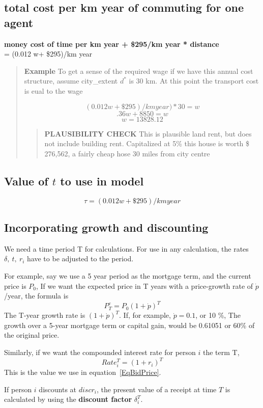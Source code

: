 \subsection{total cost per km year of commuting for one agent}
\textbf{money cost of time per km year + \$295/km year * distance} \\
= (0.012 w+ \$295)/km year 
    \begin{quotation}
    \textbf{Example}
    To get a sense of the required wage if we have this annual cost structure, assume city\_extent $d^*$ is 30 km. At this point the transport cost is  eual to the wage

\[(0.012 w+ \$295)/km year)*30 =  w\] 
\[.36w+ 8850=w\]
\[w=13828.12\]
        \begin{quotation}
        \textbf{PLAUSIBILITY CHECK}
This is plausible land rent, but does not include building rent. 
Capitalized at 5\% this house is worth \$ 276,562, a fairly cheap hose 30 miles from city centre
        \end{quotation}
    \end{quotation}

{\color{red}
\subsection{Value of $t$ to use in model}
\[ \tau=(0.012 w+ \$295)/km year \]}


\subsection{Incorporating growth and discounting}
We need a time period T for calculations. For use in any calculation, the rates $\delta,\ t,\ r_i$ have to be adjusted to the period.

For example, say we use  a 5 year period as the mortgage term, and the current price is $P_0$, If we want the expected price in  T years   with a price-growth rate of $\dot p$ /year, the formula is 
\[P^e_T=P_0(1+\dot p)^T\]
The T-year growth rate is $(1+\dot p)^T$. If, for example, $\dot p= 0.1$, or 10 \%, The growth  over a 5-year mortgage term or capital gain, would be 0.61051 or 60\% of the original price.

Similarly, if we want the compounded interest rate for person $i$ the term T,
\[Rate_i^T=(1+r_i)^T\]
This is the value we use in equation~\ref{EqBidPrice}.


If person $i$  discounts at $discr_i$, the present value of  a receipt at time $T$ is calculated by using the \textbf{discount factor} $\delta_i^T$.

